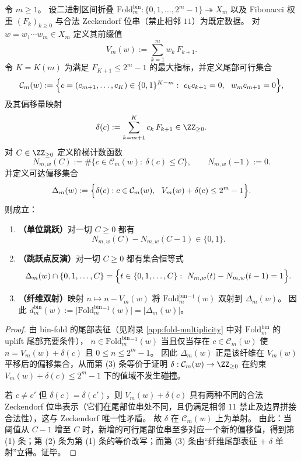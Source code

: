 \begin{theorem}\label{thm:foldbin-uplift-unit-jump-delta-inversion}
令 \(m\ge 1\)。
设二进制区间折叠
\(\mathrm{Fold}^{\mathrm{bin}}_m:\{0,1,\dots,2^m-1\}\twoheadrightarrow X_m\)
以及 Fibonacci 权重 \((F_k)_{k\ge 0}\) 与合法 Zeckendorf 位串（禁止相邻 \(11\)）为既定数据。
对 \(w=w_1\cdots w_m\in X_m\) 定义其前缀值
\[
V_m(w):=\sum_{k=1}^{m} w_k\,F_{k+1}.
\]
令 \(K=K(m)\) 为满足 \(F_{K+1}\le 2^m-1\) 的最大指标，并定义尾部可行集合
\[
\mathcal C_m(w):=
\Bigl\{c=(c_{m+1},\dots,c_{K})\in\{0,1\}^{K-m}:\ 
c_kc_{k+1}=0,\ \ w_m c_{m+1}=0\Bigr\},
\]
及其偏移量映射
\[
\delta(c):=\sum_{k=m+1}^{K} c_k\,F_{k+1}\in\ZZ_{\ge 0}.
\]
对 \(C\in\ZZ_{\ge 0}\) 定义阶梯计数函数
\[
N_{m,w}(C):=\#\{c\in\mathcal C_m(w):\ \delta(c)\le C\},
\qquad N_{m,w}(-1):=0.
\]
并定义可达偏移集合
\[
\Delta_m(w):=\Bigl\{\delta(c):c\in\mathcal C_m(w),\ \ V_m(w)+\delta(c)\le 2^m-1\Bigr\}.
\]
则成立：
\begin{enumerate}
  \item \textbf{（单位跳跃）}对一切 \(C\ge 0\) 都有
  \[
  N_{m,w}(C)-N_{m,w}(C-1)\in\{0,1\}.
  \]
  \item \textbf{（跳跃点反演）}对一切 \(C\ge 0\) 都有集合恒等式
  \[
  \Delta_m(w)\cap\{0,1,\dots,C\}
  =
  \Bigl\{t\in\{0,1,\dots,C\}:\ N_{m,w}(t)-N_{m,w}(t-1)=1\Bigr\}.
  \]
  \item \textbf{（纤维双射）}映射 \(n\mapsto n-V_m(w)\) 将 \(\mathrm{Fold}^{\mathrm{bin}}_m{}^{-1}(w)\) 双射到 \(\Delta_m(w)\)。
  因此 \(d^{\mathrm{bin}}_m(w):=\bigl|\mathrm{Fold}^{\mathrm{bin}}_m{}^{-1}(w)\bigr|=|\Delta_m(w)|\)。
\end{enumerate}
\end{theorem}
\begin{proof}
由 bin-fold 的尾部表征（见附录 \ref{app:fold-multiplicity} 中对 \(\mathrm{Fold}^{\mathrm{bin}}_m\) 的 uplift 尾部充要条件），
\(
n\in \mathrm{Fold}^{\mathrm{bin}}_m{}^{-1}(w)
\)
当且仅当存在 \(c\in\mathcal C_m(w)\) 使
\(
n=V_m(w)+\delta(c)
\)
且 \(0\le n\le 2^m-1\)。
因此 \(\Delta_m(w)\) 正是该纤维在 \(V_m(w)\) 平移后的偏移集合，从而第 (3) 条等价于证明 \(\delta:\mathcal C_m(w)\to\ZZ_{\ge 0}\) 在约束 \(V_m(w)+\delta(c)\le 2^m-1\) 下的值域不发生碰撞。
\par
若 \(c\neq c'\) 但 \(\delta(c)=\delta(c')\)，则 \(V_m(w)+\delta(c)\) 具有两种不同的合法 Zeckendorf 位串表示（它们在尾部位串处不同，且仍满足相邻 \(11\) 禁止及边界拼接合法性），这与 Zeckendorf 唯一性矛盾。
故 \(\delta\) 在 \(\mathcal C_m(w)\) 上为单射。
由此：当阈值从 \(C-1\) 增至 \(C\) 时，新增的可行尾部位串至多对应一个新的偏移值，得到第 (1) 条；第 (2) 条为第 (1) 条的等价改写；而第 (3) 条由“纤维尾部表征 + \(\delta\) 单射”立得。证毕。
\end{proof}
